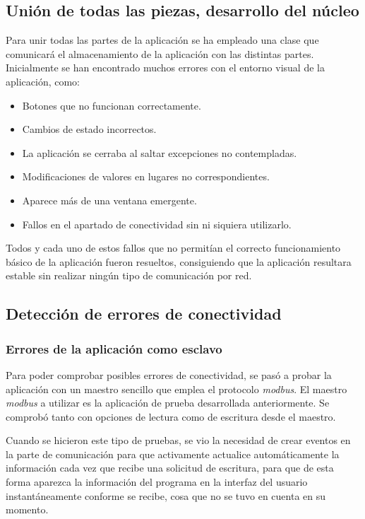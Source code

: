 \documentclass[pdftex,11pt,a4paper]{book}
\begin{document}
\subsection{Unión de todas las piezas, desarrollo del núcleo}

Para unir todas las partes de la aplicación se ha empleado una clase que comunicará el almacenamiento de la aplicación con las distintas partes. Inicialmente se han encontrado muchos errores con el entorno visual de la aplicación, como:

\begin{itemize}
\item Botones que no funcionan correctamente.
\item Cambios de estado incorrectos.
\item La aplicación se cerraba al saltar excepciones no contempladas.
\item Modificaciones de valores en lugares no correspondientes.
\item Aparece más de una ventana emergente.
\item Fallos en el apartado de conectividad sin ni siquiera utilizarlo.
\end{itemize}

Todos y cada uno de estos fallos que no permitían el correcto funcionamiento básico de la aplicación fueron resueltos, consiguiendo que la aplicación resultara estable sin realizar ningún tipo de comunicación por red.

\subsection{Detección de errores de conectividad}

\subsubsection{Errores de la aplicación como esclavo}

Para poder comprobar posibles errores de conectividad, se pasó a probar la aplicación con un maestro sencillo que emplea el protocolo \emph{modbus}. El maestro \emph{modbus} a utilizar es la aplicación de prueba desarrollada anteriormente. Se comprobó tanto con opciones de lectura como de escritura desde el maestro.

Cuando se hicieron este tipo de pruebas, se vio la necesidad de crear eventos en la parte de comunicación para que activamente actualice automáticamente la información cada vez que recibe una solicitud de escritura, para que de esta forma aparezca la información del programa en la interfaz del usuario instantáneamente conforme se recibe, cosa que no se tuvo en cuenta en su momento.
\end{document}
